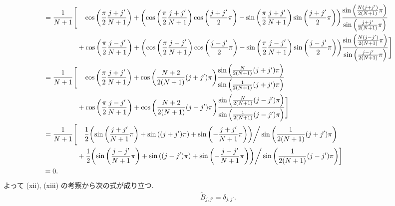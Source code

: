 \documentclass[uplatex,dvipdfmx,a4paper,11pt]{jlreq}
\theoremstyle{definition}
\begin{document}
\begin{align}
                   & \ \begin{aligned}
                         = \frac{1}{N+1}\Bigg[ & \quad\cos\qty(\frac{\pi}{2}\frac{j + j'}{N+1}) + \qty(\cos\qty(\frac{\pi}{2}\frac{j + j'}{N+1})\cos\qty(\frac{j+j'}{2}\pi) - \sin\qty(\frac{\pi}{2}\frac{j + j'}{N+1})\sin\qty(\frac{j+j'}{2}\pi))\frac{\sin\qty(\frac{N(j+j')}{2(N+1)}\pi)}{\sin\qty(\frac{j+j'}{2(N+1)}\pi)}    \\
                                               & + \cos\qty(\frac{\pi}{2}\frac{j - j'}{N+1}) + \qty(\cos\qty(\frac{\pi}{2}\frac{j - j'}{N+1})\cos\qty(\frac{j-j'}{2}\pi) - \sin\qty(\frac{\pi}{2}\frac{j - j'}{N+1})\sin\qty(\frac{j-j'}{2}\pi))\frac{\sin\qty(\frac{N(j-j')}{2(N+1)}\pi)}{\sin\qty(\frac{j-j'}{2(N+1)}\pi)}\Bigg]
                       \end{aligned}                                                                             \\
                   & \ \begin{aligned}
                         = \frac{1}{N+1}\Bigg[ & \quad\cos\qty(\frac{\pi}{2}\frac{j + j'}{N+1}) + \cos\qty(\frac{N+2}{2(N+1)}(j + j')\pi)\frac{\sin\qty(\frac{N}{2(N+1)}(j+j')\pi)}{\sin\qty(\frac{1}{2(N+1)}(j+j')\pi)}    \\
                                               & + \cos\qty(\frac{\pi}{2}\frac{j - j'}{N+1}) + \cos\qty(\frac{N+2}{2(N+1)}(j - j')\pi)\frac{\sin\qty(\frac{N}{2(N+1)}(j-j')\pi)}{\sin\qty(\frac{1}{2(N+1)}(j-j')\pi)}\Bigg]
                       \end{aligned}                                                                         \\
                   & \ \begin{aligned}
                         = \frac{1}{N+1}\Bigg[ & \quad\frac{1}{2}\qty(\sin\qty(\frac{j + j'}{N+1}\pi) + \sin\qty((j + j')\pi) + \sin\qty(-\frac{j+j'}{N+1}\pi))\bigg/\sin\qty(\frac{1}{2(N+1)}(j+j')\pi)    \\
                                               & + \frac{1}{2}\qty(\sin\qty(\frac{j - j'}{N+1}\pi) + \sin\qty((j - j')\pi) + \sin\qty(-\frac{j-j'}{N+1}\pi))\bigg/\sin\qty(\frac{1}{2(N+1)}(j-j')\pi)\bigg]
                       \end{aligned} \\
                   & = 0.
\end{align}
よって (xii), (xiii) の考察から次の式が成り立つ.
\begin{align}
  \tilde{B}_{j,j'} = \delta_{j,j'}.
\end{align}
\end{document}
